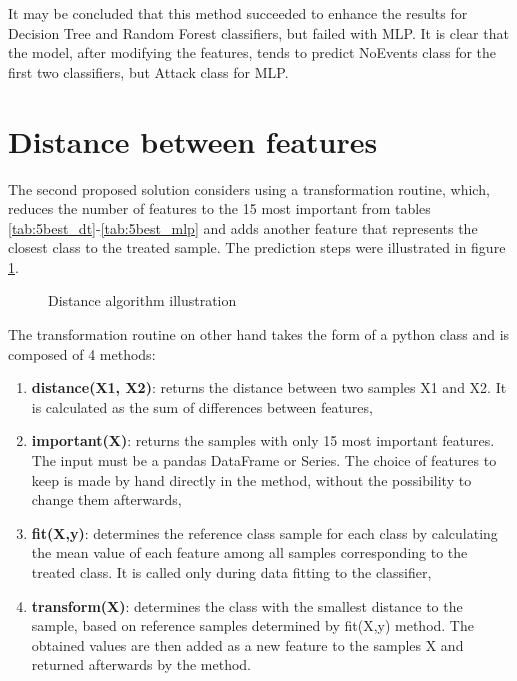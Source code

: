 It may be concluded that this method succeeded to enhance the results for Decision Tree and Random Forest classifiers, but failed with MLP. It is clear that the model, after modifying the features, tends to predict NoEvents class for the first two classifiers, but Attack class for MLP.  

\section{Distance between features}
The second proposed solution considers using a transformation routine, which, reduces the number of features to the 15 most important from tables \ref{tab:5best_dt}-\ref{tab:5best_mlp} and adds another feature that represents the closest class to the treated sample. The prediction steps were illustrated in figure \ref{fig:distill}.

\begin{figure}[H]
    \centering
    \caption{Distance algorithm illustration}
    \label{fig:distill}
\end{figure}

The transformation routine on other hand takes the form of a python class and is composed of 4 methods:
\begin{enumerate}
    \item \textbf{distance(X1, X2)}: returns the distance between two samples X1 and X2. It is calculated as the sum of differences between features,
    \item \textbf{important(X)}: returns the samples with only 15 most important features. The input must be a pandas DataFrame or Series. The choice of features to keep is made by hand directly in the method, without the possibility to change them afterwards,
    \item \textbf{fit(X,y)}: determines the reference class sample for each class by calculating the mean value of each feature among all samples corresponding to the treated class. It is called only during data fitting to the classifier,
    \item \textbf{transform(X)}: determines the class with the smallest distance to the sample, based on reference samples determined by fit(X,y) method. The obtained values are then added as a new feature to the samples X and returned afterwards by the method.
\end{enumerate}

